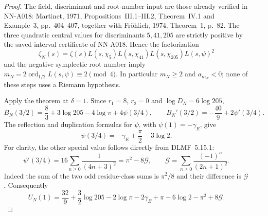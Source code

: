 \begin{proof}
The field, discriminant and root-number input are those already
verified in NN-A018: Martinet, 1971, Propositions~III.1--III.2,
Theorem~IV.1 and Example~3, pp.~404--407, together with
Fr\"ohlich, 1974, Theorem~1, p.~82. The three quadratic central
values for discriminants $5,41,205$ are strictly positive by
the saved interval certificate of NN-A018. Hence the
factorization
\[
 \zeta_N(s)=\zeta(s)L(s,\chi_5)L(s,\chi_{41})
                         L(s,\chi_{205})L(s,\psi)^2
\]
and the negative symplectic root number imply
$m_N=2\operatorname{ord}_{1/2}L(s,\psi)\equiv2\pmod4$.
In particular $m_N\ge2$ and $a_{m_N}<0$; none of these steps
uses a Riemann hypothesis.

Apply the theorem at $\delta=1$. Since $r_1=8$, $r_2=0$ and
$\log D_N=6\log205$,
\[
 B_N(3/2)=\frac83+3\log205-4\log\pi+4\psi(3/4),
 \qquad
 B_N'(3/2)=-\frac{40}9+2\psi'(3/4).
\]
The reflection and duplication formulas for $\psi$, with
$\psi(1)=-\gamma_{\!E}$, give
\[
 \psi(3/4)=-\gamma_{\!E}+\frac\pi2-3\log2.
\]
For clarity, the other special value follows directly from
DLMF~5.15.1:
\[
 \psi'(3/4)=16\sum_{n\ge0}\frac1{(4n+3)^2}
                  =\pi^2-8\mathcal G,
 \qquad
 \mathcal G=\sum_{n\ge0}\frac{(-1)^n}{(2n+1)^2}.
\]
Indeed the sum of the two odd residue-class sums is
$\pi^2/8$ and their difference is $\mathcal G$.
Consequently
\begin{equation}\label{eq:analytic-martinet-U-exact}
 U_N(1)=\frac{32}9+\frac32\log205-2\log\pi
       -2\gamma_{\!E}+\pi-6\log2-\pi^2+8\mathcal G.
\end{equation}


\end{proof}
